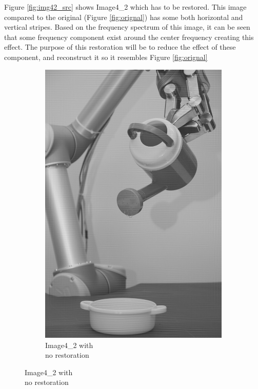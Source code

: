 Figure \ref{fig:img42_src} shows  Image4\_2 which has to be restored. This image  compared to the original  (Figure \ref{fig:orignal}) has some both horizontal and vertical stripes.   Based on the frequency spectrum of this image, it can be seen that some frequency component exist around the center frequency creating this effect. The purpose of this restoration will be to reduce the effect of these component, and reconstruct it so it resembles Figure \ref{fig:orignal}

\begin{figure}[H]
    \centering
    \begin{subfigure}[b]{0.23\textwidth}
        \includegraphics[width=\textwidth]{img4/Image4_2.png}
        \caption{Image4\_2 with \\no restoration}

\end{subfigure}
\end{figure}
